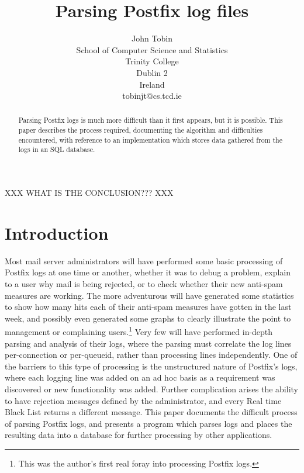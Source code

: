 \documentclass[a4paper,12pt,draft]{article}
\begin{document}
\title{Parsing Postfix log files}
\author{John Tobin \\ School of Computer Science and Statistics \\ 
Trinity College \\ Dublin 2 \\ Ireland \\ tobinjt@cs.tcd.ie}
\date{}
\maketitle

\begin{abstract}
    
    Parsing Postfix logs is much more difficult than it first appears, but
    it is possible.  This paper describes the process required, documenting
    the algorithm and difficulties encountered, with reference to an
    implementation which stores data gathered from the logs in an SQL
    database.

\end{abstract}

XXX WHAT IS THE CONCLUSION??? XXX

\newpage
\tableofcontents

\section{Introduction}

Most mail server administrators will have performed some basic processing
of Postfix logs at one time or another, whether it was to debug a problem,
explain to a user why mail is being rejected, or to check whether their new
anti-spam measures are working.  The more adventurous will have generated
some statistics to show how many hits each of their anti-spam measures have
gotten in the last week, and possibly even generated some graphs to clearly
illustrate the point to management or complaining users.\footnote{This was
the author's first real foray into processing Postfix logs.}  Very few will
have performed in-depth parsing and analysis of their logs, where the
parsing must correlate the log lines per-connection or per-queueid, rather
than processing lines independently.  One of the barriers to this type of
processing is the unstructured nature of Postfix's logs, where each logging
line was added on an ad hoc basis as a requirement was discovered or new
functionality was added.  Further complication arises the ability to have
rejection messages defined by the administrator, and every Real time Black
List returns a different message.  This paper documents the difficult
process of parsing Postfix logs, and presents a program which parses logs
and places the resulting data into a database for further processing by
other applications.
\end{document}
